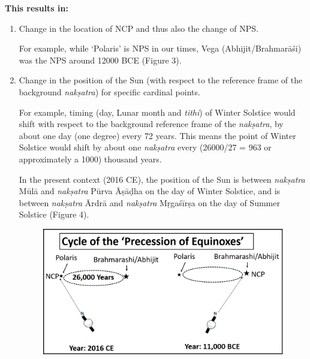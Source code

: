 \textbf{This results in:}

\begin{enumerate}
\itemsep=0pt
\item 
 Change in the location of NCP and thus also the change of NPS.

 For example, while ‘Polaris’ is NPS in our times, Vega (Abhijit/Brahmarāśi) was the NPS around 12000 BCE (Figure 3).

 \item Change in the position of the Sun (with respect to the reference frame of the background \textit{nakṣatra}) for specific cardinal points.

 For example, timing (day, Lunar month and \textit{tithi}) of Winter Solstice would shift with respect to the background reference frame of the \textit{nakṣatra}, by about one day (one degree) every 72 years. This means the point of Winter Solstice would shift by about one \textit{nakṣatra} every (26000/27 = 963 or approximately a 1000) thousand years.

 In the present context (2016 CE), the position of the Sun is between \textit{nakṣatra} Mūlā and \textit{nakṣatra} Pūrva Āṣāḍha on the day of Winter Solstice, and is between \textit{nakṣatra} Ārdrā and \textit{nakṣatra} Mṛgaśīrṣa on the day of Summer Solstice (Figure 4).


\begin{figure}[!h]
\includegraphics[scale=.17]{images/chap2-4.jpg}\\[0.1cm]
\end{figure}



\end{enumerate}
